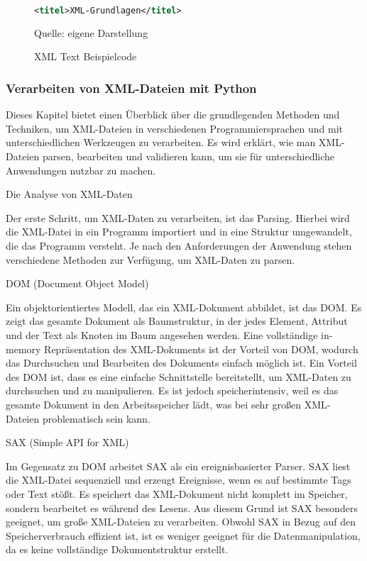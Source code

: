 \begin{figure}[H]
\centering
\begin{minipage}{0.95\textwidth}
\begin{lstlisting}[language=XML]
<titel>XML-Grundlagen</titel>
\end{lstlisting}
\end{minipage}
\caption{XML Text Beispielcode}
\label{fig:XML Text Beispielcode}
    {Quelle: eigene Darstellung}
\end{figure}
\cite*{Becher2022}

\color{red}     %
\subsubsection{Verarbeiten von XML-Dateien mit Python}

Dieses Kapitel bietet einen Überblick über die grundlegenden Methoden und Techniken, um \ac{XML}-Dateien in verschiedenen Programmiersprachen und mit unterschiedlichen Werkzeugen zu verarbeiten.
Es wird erklärt, wie man \ac{XML}-Dateien parsen, bearbeiten und validieren kann, um sie für unterschiedliche Anwendungen nutzbar zu machen.

Die Analyse von \ac{XML}-Daten

Der erste Schritt, um \ac{XML}-Daten zu verarbeiten, ist das Parsing.
Hierbei wird die \ac{XML}-Datei in ein Programm importiert und in eine Struktur umgewandelt, die das Programm versteht.
Je nach den Anforderungen der Anwendung stehen verschiedene Methoden zur Verfügung, um \ac{XML}-Daten zu parsen.

DOM (Document Object Model)

Ein objektorientiertes Modell, das ein \ac{XML}-Dokument abbildet, ist das DOM.
Es zeigt das gesamte Dokument als Baumstruktur, in der jedes Element, Attribut und der Text als Knoten im Baum angesehen werden.
Eine vollständige in-memory Repräsentation des \ac{XML}-Dokuments ist der Vorteil von DOM, wodurch das Durchsuchen und Bearbeiten des Dokuments einfach möglich ist.
Ein Vorteil des DOM ist, dass es eine einfache Schnittstelle bereitstellt, um \ac{XML}-Daten zu durchsuchen und zu manipulieren.
Es ist jedoch speicherintensiv, weil es das gesamte Dokument in den Arbeitsspeicher lädt, was bei sehr großen \ac{XML}-Dateien problematisch sein kann.

SAX (Simple API for \ac{XML})

Im Gegensatz zu DOM arbeitet SAX als ein ereignisbasierter Parser.
SAX liest die \ac{XML}-Datei sequenziell und erzeugt Ereignisse, wenn es auf bestimmte Tags oder Text stößt.
Es speichert das \ac{XML}-Dokument nicht komplett im Speicher, sondern bearbeitet es während des Lesens.
Aus diesem Grund ist SAX besonders geeignet, um große \ac{XML}-Dateien zu verarbeiten.
Obwohl SAX in Bezug auf den Speicherverbrauch effizient ist, ist es weniger geeignet für die Datenmanipulation, da es keine vollständige Dokumentstruktur erstellt.

